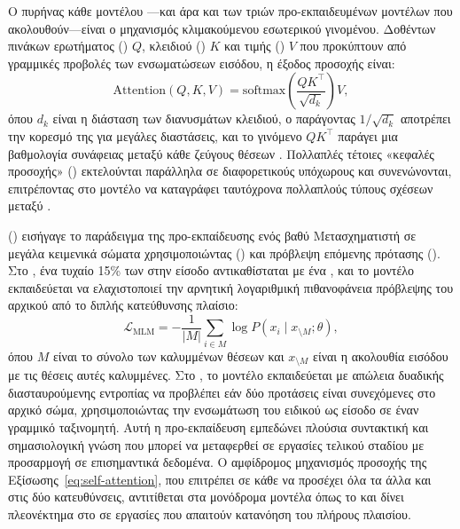 Ο πυρήνας κάθε μοντέλου ---και άρα και των τριών προ-εκπαιδευμένων
μοντέλων που ακολουθούν---είναι ο μηχανισμός  κλιμακούμενου
εσωτερικού γινομένου. Δοθέντων πινάκων ερωτήματος () $Q$, κλειδιού
() $K$ και τιμής () $V$ που προκύπτουν από γραμμικές προβολές
των ενσωματώσεων εισόδου, η έξοδος προσοχής είναι:
\begin{equation}
    \mathrm{Attention}(Q, K, V) = \mathrm{softmax}\!\left(\frac{QK^\top}{\sqrt{d_k}}\right) V,
    \label{eq:self-attention}
\end{equation}
όπου $d_k$ είναι η διάσταση των διανυσμάτων κλειδιού, ο παράγοντας $1/\sqrt{d_k}$
αποτρέπει την κορεσμό της  για μεγάλες διαστάσεις, και το γινόμενο
$QK^\top$ παράγει μια βαθμολογία συνάφειας μεταξύ κάθε ζεύγους θέσεων .
Πολλαπλές τέτοιες «κεφαλές προσοχής» () εκτελούνται
παράλληλα σε διαφορετικούς υπόχωρους και συνενώνονται, επιτρέποντας στο μοντέλο
να καταγράφει ταυτόχρονα πολλαπλούς τύπους σχέσεων μεταξύ .

\textbf{} \cite{devlin2019bert} () εισήγαγε το παράδειγμα της προ-εκπαίδευσης ενός βαθύ Μετασχηματιστή
σε μεγάλα κειμενικά σώματα χρησιμοποιώντας  ()
και πρόβλεψη επόμενης πρότασης (). Στο , ένα τυχαίο 15\% των 
στην είσοδο αντικαθίσταται με ένα  \texttt{\en{[MASK]}}, και το μοντέλο
εκπαιδεύεται να ελαχιστοποιεί την αρνητική λογαριθμική πιθανοφάνεια πρόβλεψης του
αρχικού  από το διπλής κατεύθυνσης πλαίσιο:
\begin{equation}
    \mathcal{L}_{\mathrm{MLM}} = -\frac{1}{|M|} \sum_{i \in M} \log P(x_i \mid x_{\setminus M}; \theta),
    \label{eq:bert-mlm}
\end{equation}
όπου $M$ είναι το σύνολο των καλυμμένων θέσεων και $x_{\setminus M}$ είναι η
ακολουθία εισόδου με τις θέσεις αυτές καλυμμένες.
Στο , το μοντέλο εκπαιδεύεται με απώλεια δυαδικής διασταυρούμενης εντροπίας
να προβλέπει εάν δύο προτάσεις είναι συνεχόμενες στο αρχικό σώμα, χρησιμοποιώντας
την ενσωμάτωση του ειδικού  \texttt{\en{[CLS]}} ως είσοδο σε έναν
γραμμικό ταξινομητή.
Αυτή η προ-εκπαίδευση εμπεδώνει πλούσια συντακτική και σημασιολογική
γνώση που μπορεί να μεταφερθεί σε εργασίες τελικού σταδίου με προσαρμογή σε επισημαντικά
δεδομένα.
Ο αμφίδρομος μηχανισμός προσοχής της Εξίσωσης~\ref{eq:self-attention}, που επιτρέπει σε κάθε 
να προσέχει όλα τα άλλα  και στις δύο κατευθύνσεις, αντιτίθεται στα
μονόδρομα μοντέλα όπως το  και δίνει πλεονέκτημα στο  σε εργασίες που
απαιτούν κατανόηση του πλήρους πλαισίου.

